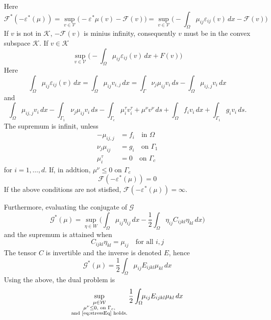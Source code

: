\documentclass[12pt,a4paper]{article}
\numberwithin{equation}{section}
\numberwithin{table}{section}
\numberwithin{figure}{section}
\newcommand{\W}{\ensuremath{\mathcal{W}}}
\newcommand{\half}{\ensuremath{\frac{1}{2}}}
\newcommand{\V}{\ensuremath{\mathcal{V}}}
\newcommand{\K}{\ensuremath{\mathcal{K}}}
\newcommand{\F}{\ensuremath{{\mathcal F}}}
\newcommand{\G}{\ensuremath{{\mathcal G}}}
\newcommand{\intO}{\int_\Omega\!\!}
\newcommand{\intG}[1][0]{\int_{\Gamma_{#1}}\!\!}
\renewcommand{\epsilon}{\varepsilon}
\newcommand{\strain}[1][]{\ensuremath{\epsilon_{#1}}}
\newcommand{\epsij}{\strain[ij]}
\newcommand{\dx}{{\,dx}}
\newcommand{\ds}{{\,ds}}
\begin{document}
Here
\begin{equation}
  \F^*(-\strain^*(\mu)) = \sup_{v \in \V} \bigl(-\strain^* \mu(v)
   - \F(v)\bigr)
  = \sup_{v\in \V} \bigl(-\intO \mu_{ij}\epsij(v) \dx - \F(v) \bigr)
\end{equation}
If $v$ is not in $\K$, $-\F(v)$ is minius infinity, consequently $v$ must be in the convex subspace $\K$. If $v\in \K$
\begin{equation}
  \sup_{v\in\V} \bigl(-\intO \mu_{ij}\epsij(v) \dx + F(v) \bigr)
\end{equation}
Here
\begin{equation}
  \intO \mu_{ij} \epsij(v) \dx = \intO \mu_{ij} v_{i,j} \dx
  = \int_\Gamma \nu_j \mu_{ij} v_i \ds - \intO \mu_{ij,j} v_i \dx
\end{equation}
and
\begin{equation}
  \intO \mu_{ij,j} v_i \dx - \intG[1] \nu_j \mu_{ij} v_i \ds 
  - \intG[c] \mu^\tau_i v^\tau_i + \mu^\nu v^\nu \ds + \intO f_i v_i \dx
  +   \intG[1] g_i v_i\ds.
\end{equation}
The supremum is infinit, unless
\begin{equation}
  \label{eq:stressEq}
  \begin{split}
    -\mu_{ij,j} &= f_i \quad\text{in $\Omega$} \\
    \nu_j \mu_{ij} &= g_i \quad\text{on $\Gamma_1$} \\
    \mu_i^\tau &= 0 \quad\text{on $\Gamma_c$}      
  \end{split}
\end{equation} 
for $i=1,\ldots,d$. If, in addtion, $\mu^\nu \le 0$ on $\Gamma_c$
\begin{equation}
  \F(-\strain^*(\mu)) = 0
\end{equation}
If the above conditions are not stisfied, $\F(-\strain^*(\mu)) = \infty$.

Furthermore, evaluating the conjugate of $\G$
\begin{equation}
  \G^*(\mu) = \sup_{\eta\in W} \bigl(\intO \mu_{ij} \eta_{ij} \dx
   - \half \intO \eta_{ij} C_{ijkl} \eta_{kl} \dx \bigr)
\end{equation}
and the supremum is attained when
\begin{equation}
  C_{ijkl} \eta_{kl} = \mu_{ij} \quad\text{for all $i,j$}
\end{equation}
The tensor $C$ is invertible and the inverse is denoted $E$, hence
\begin{equation}
  \G^*(\mu) = \half \intO \mu_{ij} E_{ijkl} \mu_{kl} \dx
\end{equation}
Using the above, the dual problem is
\begin{equation}
  \sup_{\substack{\mu\in\W \\ \mu^{\nu} \le 0, \text{ on $\Gamma_c$}, \\
   \text{and \eqref{eq:stressEq} holds.}}}
  \half \intO \mu_{ij} E_{ijkl} \mu_{kl} \dx
\end{equation}
\end{document}
